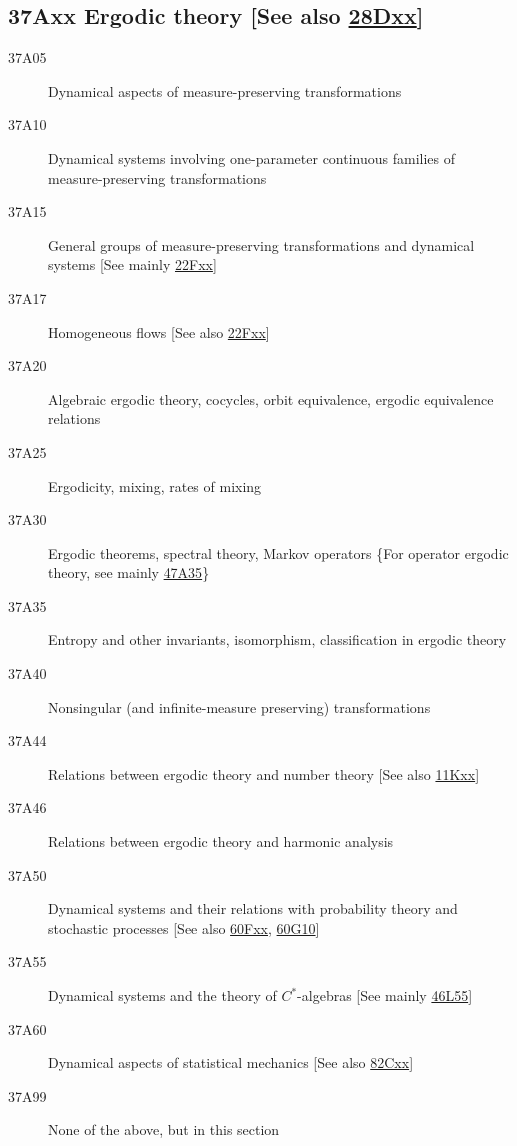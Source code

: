 \subsection*{37Axx  Ergodic theory [See also \hyperref[28Dxx]{28Dxx}] }\label{37Axx}
\begin{description}  
\item [37A05]\label{37A05} Dynamical aspects of measure-preserving transformations 
\item [37A10]\label{37A10} Dynamical systems involving one-parameter continuous families of measure-preserving transformations
\item [37A15]\label{37A15} General groups of measure-preserving transformations and dynamical systems [See mainly \hyperref[22Fxx]{22Fxx}]
\item [37A17]\label{37A17} Homogeneous flows [See also \hyperref[22Fxx]{22Fxx}]
\item [37A20]\label{37A20} Algebraic ergodic theory, cocycles, orbit equivalence,  ergodic equivalence relations
\item [37A25]\label{37A25} Ergodicity, mixing, rates of mixing
\item [37A30]\label{37A30} Ergodic theorems, spectral theory, Markov operators \{For operator ergodic theory, see mainly \hyperref[47A35]{47A35}\}
\item [37A35]\label{37A35} Entropy and other invariants, isomorphism, classification in ergodic theory
\item [37A40]\label{37A40} Nonsingular (and infinite-measure preserving) transformations 
\item [37A44]\label{37A44} Relations between ergodic theory and number theory  [See also \hyperref[11Kxx]{11Kxx}]
\item [37A46]\label{37A46} Relations between ergodic theory and harmonic analysis 
\item [37A50]\label{37A50} Dynamical systems and their relations with probability theory and stochastic processes [See also \hyperref[60Fxx]{60Fxx}, \hyperref[60G10]{60G10}]
\item [37A55]\label{37A55}  Dynamical systems and  the theory of $C^*$-algebras [See mainly \hyperref[46L55]{46L55}]
\item [37A60]\label{37A60} Dynamical aspects of  statistical mechanics [See also \hyperref[82Cxx]{82Cxx}]
\item [37A99]\label{37A99} None of the above, but in this section
\end{description}
